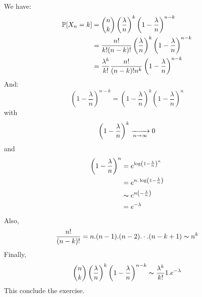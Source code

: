 \begin{solution}
  We have:
  \begin{align*}
    \mathbb{P}[X_n = k] & = \binom{n}{k} \left( \frac{\lambda}{n} \right)^k \left(  1- \frac{\lambda}{n} \right)^{n-k}        \\
                    & = \frac{n!}{k!(n-k)!} \left( \frac{\lambda}{n} \right)^k \left(  1- \frac{\lambda}{n} \right)^{n-k} \\
                    & = \frac{\lambda^k}{k!} \frac{n!}{(n-k)! n^k} \left(  1- \frac{\lambda}{n} \right)^{n-k}
  \end{align*}
  And:
  \[
    \left(  1- \frac{\lambda}{n} \right)^{n-k} = {\left(  1- \frac{\lambda}{n} \right)}^{k} \left(  1- \frac{\lambda}{n} \right)^{n}
  \]
  with
  \[
    \left(  1- \frac{\lambda}{n} \right)^{k} \xrightarrow[n \to{} \infty]{} 0
  \]
  and
  \begin{align*}
    \left(  1- \frac{\lambda}{n} \right)^n & = e^{\log\left(  1- \frac{\lambda}{n} \right)^n}  \\
                                           & = e^{n.\log\left(  1- \frac{\lambda}{n} \right)}  \\
                                           & \thicksim e^{n\left( - \frac{\lambda}{n} \right)} \\
                                           & = e^{-\lambda}
  \end{align*}
  Also,
  \[ \frac{n!}{(n-k)!}= n.(n-1).(n-2). \cdot . (n-k+1) \thicksim n^k \]
  Finally,
  \[
    \binom{n}{k} \left( \frac{\lambda}{n} \right)^k \left(  1- \frac{\lambda}{n} \right)^{n-k} \thicksim \frac{\lambda^k}{k!} 1. e^{-\lambda}
  \]
  This conclude the exercise.
\end{solution}